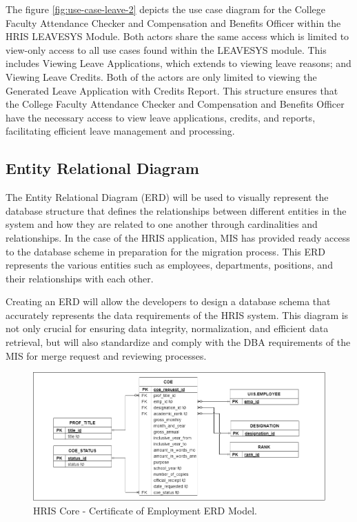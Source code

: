     The figure \ref{fig:use-case-leave-2} depicts the use case diagram for the College Faculty Attendance Checker and Compensation and Benefits Officer within the HRIS LEAVESYS Module. Both actors share the same access which is limited to view-only access to all use cases found within the LEAVESYS module. This includes Viewing Leave Applications, which extends to viewing leave reasons; and Viewing Leave Credits. Both of the actors are only limited to viewing the Generated Leave Application with Credits Report. This structure ensures that the College Faculty Attendance Checker and Compensation and Benefits Officer have the necessary access to view leave applications, credits, and reports, facilitating efficient leave management and processing.


    \subsection{Entity Relational Diagram}
    
    The Entity Relational Diagram (ERD) will be used to visually represent the database structure that defines the relationships between different entities in the system and how they are related to one another through cardinalities and relationships. In the case of the HRIS application, MIS has provided ready access to the database scheme in preparation for the migration process. This ERD represents the various entities such as employees, departments, positions, and their relationships with each other. 
    
    Creating an ERD will allow the developers to design a database schema that accurately represents the data requirements of the HRIS system. This diagram is not only crucial for ensuring data integrity, normalization, and efficient data retrieval, but will also standardize and comply with the DBA requirements of the MIS for merge request and reviewing processes.

    \begin{figure}[H]
        \centering
        \includegraphics[width=1\linewidth]{figures/images/diagrams/erd/erd-core-coe.png}
        \caption{HRIS Core - Certificate of Employment ERD Model.}
        \label{fig:erd-core-coe} 
    \end{figure}

